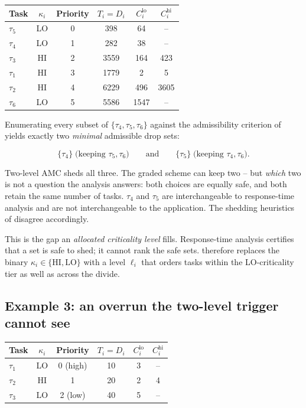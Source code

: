 \begin{center}
\begin{tabular}{lccccc}
\toprule
Task & $\kappa_i$ & Priority & $T_i = D_i$ & $C_i^{\mathrm{lo}}$ & $C_i^{\mathrm{hi}}$ \\
\midrule
$\tau_5$ & LO & 0 & 398  & 64   & --   \\
$\tau_4$ & LO & 1 & 282  & 38   & --   \\
$\tau_3$ & HI & 2 & 3559 & 164  & 423  \\
$\tau_1$ & HI & 3 & 1779 & 2    & 5    \\
$\tau_2$ & HI & 4 & 6229 & 496  & 3605 \\
$\tau_6$ & LO & 5 & 5586 & 1547 & --   \\
\bottomrule
\end{tabular}
\end{center}

\noindent Enumerating every subset of $\{\tau_4, \tau_5, \tau_6\}$ against the
admissibility criterion of  yields exactly two
\emph{minimal} admissible drop sets:

\[
\{\tau_4\} \;\text{(keeping } \tau_5, \tau_6\text{)}
\qquad\text{and}\qquad
\{\tau_5\} \;\text{(keeping } \tau_4, \tau_6\text{)} .
\]

Two-level AMC sheds all three. The graded scheme can keep two -- but
\emph{which} two is not a question the analysis answers: both choices are
equally safe, and both retain the same number of tasks. $\tau_4$ and $\tau_5$
are interchangeable to response-time analysis and are not interchangeable to
the application. The shedding heuristics of  disagree
accordingly.

This is the gap an \emph{allocated criticality level} fills. Response-time
analysis certifies that a set is safe to shed; it cannot rank the safe sets.
 therefore replaces the binary
$\kappa_i \in \{\mathrm{HI}, \mathrm{LO}\}$ with a level $\ell_i$ that orders
tasks within the LO-criticality tier as well as across the divide.

\subsection{Example 3: an overrun the two-level trigger cannot see}
\label{sec:ex-blindspot}

\begin{center}
\begin{tabular}{lccccc}
\toprule
Task & $\kappa_i$ & Priority & $T_i = D_i$ & $C_i^{\mathrm{lo}}$ & $C_i^{\mathrm{hi}}$ \\
\midrule
$\tau_1$ & LO & 0 (high) & 10 & 3 & -- \\
$\tau_2$ & HI & 1        & 20 & 2 & 4  \\
$\tau_3$ & LO & 2 (low)  & 40 & 5 & -- \\
\bottomrule
\end{tabular}
\end{center}

